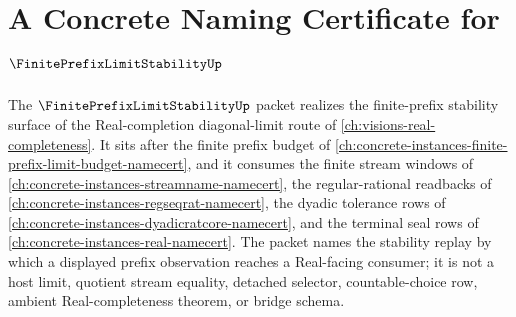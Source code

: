 \chapter{A Concrete Naming Certificate for $\FinitePrefixLimitStabilityUp$}
\label{ch:concrete-instances-finite-prefix-limit-stability-namecert}

The $\FinitePrefixLimitStabilityUp$ packet realizes the finite-prefix stability surface of the Real-completion diagonal-limit route of \autoref{ch:visions-real-completeness}. It sits after the finite prefix budget of \autoref{ch:concrete-instances-finite-prefix-limit-budget-namecert}, and it consumes the finite stream windows of \autoref{ch:concrete-instances-streamname-namecert}, the regular-rational readbacks of \autoref{ch:concrete-instances-regseqrat-namecert}, the dyadic tolerance rows of \autoref{ch:concrete-instances-dyadicratcore-namecert}, and the terminal seal rows of \autoref{ch:concrete-instances-real-namecert}. The packet names the stability replay by which a displayed prefix observation reaches a Real-facing consumer; it is not a host limit, quotient stream equality, detached selector, countable-choice row, ambient Real-completeness theorem, or bridge schema.



